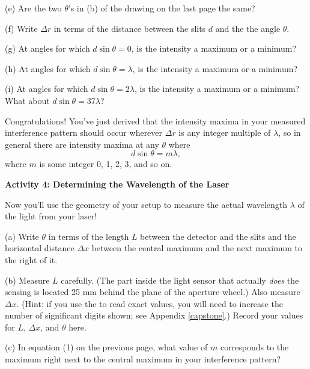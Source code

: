 (e) Are the two $\theta$'s in (b) of the drawing on the last page the same?
\answerspace{0.2in}

(f) Write $\Delta r$ in terms of the distance between the slits $d$ and the the angle $\theta$.
\answerspace{0.4in}

(g) At angles for which $d \sin \theta = 0$, is the intensity a maximum or a minimum?
\answerspace{0.2in}

(h) At angles for which $d \sin \theta = \lambda$, is the intensity a maximum or a minimum?
\answerspace{0.2in}

(i) At angles for which $d \sin \theta = 2 \lambda$, is the intensity a maximum or a minimum?  What about $d \sin \theta = 37 \lambda$?
\answerspace{0.2in}

Congratulations!  You've just derived that the intensity maxima in your measured interference pattern should occur wherever $\Delta r$ is any integer multiple of $\lambda$, so in general there are intensity maxima at any $\theta$ where
\begin{equation}
d \sin \theta = m \lambda,
\end{equation}
where $m$ is some integer 0, 1, 2, 3, and so on.  



\pagebreak[3]
\textbf{Activity 4: Determining the Wavelength of the Laser }

Now you'll use the geometry of your setup to measure the actual wavelength $\lambda$ of the light from your laser!




(a) Write $\theta$ in terms of the length $L$ between the detector and the slits and the horizontal distance $\Delta x$ between the central maximum and the next maximum to the right of it.
\answerspace{0.4in}

(b) Measure $L$ carefully.  (The part inside the light sensor that actually \textit{does} the sensing is located 25 mm behind the plane of the aperture wheel.)  
Also measure $\Delta x$.  (Hint: if you use the  to read exact values, you will need to increase the number of significant digits shown; see Appendix \ref{capstone}.)
Record your values for $L$, $\Delta x$, and $\theta$ here.

\answerspace{0.8in}

(c) In equation (1) on the previous page, what value of $m$ corresponds to the maximum right next to the central maximum in your interference pattern?
\answerspace{0.3in}
 
